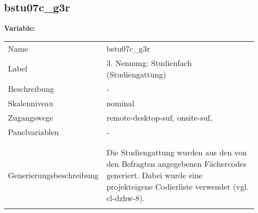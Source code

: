 	
	
	\subsection{bstu07c\_g3r}
	\label{subSection:bstu07c_g3r}

	\noindent\textbf{Variable:}\\
		\begin{tabular}{lL{11.3cm}}
			\label{tableVariable:bstu07c_g3r}
			Name & bstu07c\_g3r \\
			Label & 3. Nennung: Studienfach (Studiengattung) \\
			Beschreibung & - \\
			Skalenniveau & nominal \\
			Zugangswege &
				remote-desktop-suf,
				onsite-suf,
 \\
			Panelvariablen & -
			 \\
			 \\
 \\
					Generierungsbeschreibung & Die Studiengattung wurden aus den von den Befragten angegebenen Fächercodes generiert.  Dabei wurde eine projekteigene Codierliste verwendet (vgl. cl-dzhw-8).
				 \\	
			 \\
		\end{tabular}






